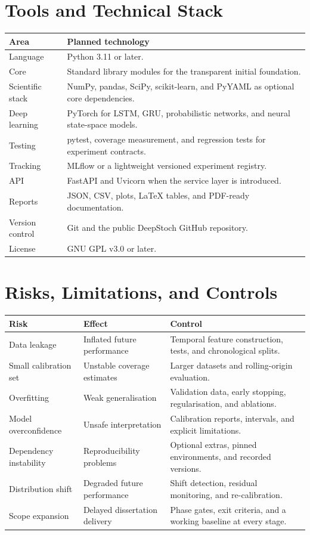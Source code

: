 \documentclass[11pt,a4paper]{report}
\begin{document}
\chapter{Tools and Technical Stack}
\begin{longtable}{p{}p{}}
\toprule
\textbf{Area} & \textbf{Planned technology} \\
\midrule
Language & Python 3.11 or later. \\
Core & Standard library modules for the transparent initial foundation. \\
Scientific stack & NumPy, pandas, SciPy, scikit-learn, and PyYAML as optional core dependencies. \\
Deep learning & PyTorch for LSTM, GRU, probabilistic networks, and neural state-space models. \\
Testing & pytest, coverage measurement, and regression tests for experiment contracts. \\
Tracking & MLflow or a lightweight versioned experiment registry. \\
API & FastAPI and Uvicorn when the service layer is introduced. \\
Reports & JSON, CSV, plots, LaTeX tables, and PDF-ready documentation. \\
Version control & Git and the public DeepStoch GitHub repository. \\
License & GNU GPL v3.0 or later. \\
\bottomrule
\end{longtable}

\chapter{Risks, Limitations, and Controls}
\begin{longtable}{p{}p{}p{}}
\toprule
\textbf{Risk} & \textbf{Effect} & \textbf{Control} \\
\midrule
Data leakage & Inflated future performance & Temporal feature construction, tests, and chronological splits. \\
Small calibration set & Unstable coverage estimates & Larger datasets and rolling-origin evaluation. \\
Overfitting & Weak generalisation & Validation data, early stopping, regularisation, and ablations. \\
Model overconfidence & Unsafe interpretation & Calibration reports, intervals, and explicit limitations. \\
Dependency instability & Reproducibility problems & Optional extras, pinned environments, and recorded versions. \\
Distribution shift & Degraded future performance & Shift detection, residual monitoring, and re-calibration. \\
Scope expansion & Delayed dissertation delivery & Phase gates, exit criteria, and a working baseline at every stage. \\
\bottomrule
\end{longtable}
\end{document}
